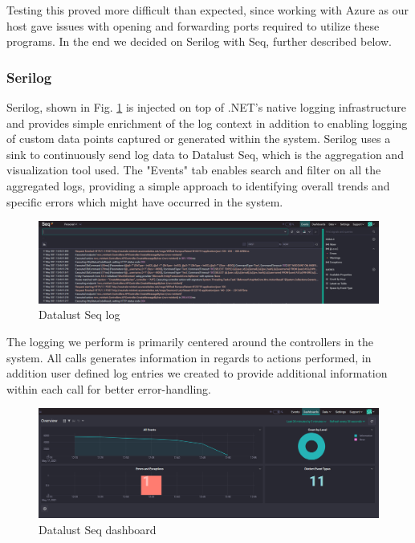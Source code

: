 \documentclass{article}
\begin{document}
Testing this proved more difficult than expected, since working with Azure as our host gave issues with opening and forwarding ports required to utilize these programs.
In the end we decided on Serilog with Seq, further described below.

\subsubsection{Serilog}
Serilog, shown in Fig. \ref{fig:seqlog}  is injected on top of .NET's native logging infrastructure and provides simple enrichment of the log context in addition to enabling logging of custom data points captured or generated within the system.
Serilog uses a sink to continuously send log data to Datalust Seq, which is the aggregation and visualization tool used.
The "Events" tab enables search and filter on all the aggregated logs, providing a simple approach to identifying overall trends and specific errors which might have occurred in the system.

\begin{figure}[H]
\centering
\includegraphics[width=1\textwidth]{images/DatalustSeq.PNG}
\caption{\label{fig:seqlog} Datalust Seq log}
\end{figure}

The logging we perform is primarily centered around the controllers in the system. All calls generates information in regards to actions performed, in addition user defined log entries we created to provide additional information within each call for better error-handling.

\begin{figure}[H]
\centering
\includegraphics[width=1\textwidth]{images/DatalustSeq2.PNG}
\caption{\label{fig:seqdashboard} Datalust Seq dashboard}
\end{figure}
\newpage
\end{document}
